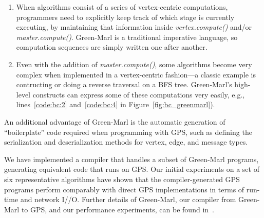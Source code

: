 \begin{enumerate}
\item When algorithms consist of a series of vertex-centric computations, programmers need to explicitly keep \break track of which stage is currently executing, by maintaining that information inside {\em vertex.compute()} and/or {\em master.compute()}.
Green-Marl is a traditional imperative language, so computation sequences are simply written one after another.
\item Even with the addition of {\em master.compute()}, some algorithms become very complex when implemented in a vertex-centric fashion---a classic example is contructing or doing a reverse traversal on a BFS tree.
Green-Marl's high-level constructs can express some of these computations very easily, e.g., lines~\ref{code:bc:2} and~\ref{code:bc:4} in Figure~\ref{fig:bc_greenmarl}).
\end{enumerate}
An additional advantage of Green-Marl is the automatic generation of ``boilerplate'' code required when programming with GPS, such as defining the serialization and deserialization methods for vertex, edge, and message types.

We have implemented a compiler that handles a subset of Green-Marl programs, generating equivalent code that runs on GPS.
Our initial experiments on a set of six representative algorithms have shown that
the compiler-generated GPS programs perform comparably with direct GPS implementations in terms of run-time and network I//O.
Further details of Green-Marl, our compiler from Green-Marl to GPS, and our performance experiments, can be found in~\cite{hong:gm-to-gps-tech-report}.

